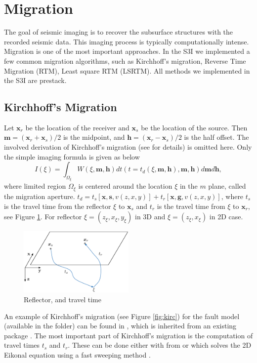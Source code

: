 \documentclass[11pt,titlepage]{article}
\newcommand{\bx}{\boldsymbol{x}}
\newcommand{\bg}{\boldsymbol{g}}
\newcommand{\bh}{\boldsymbol{h}}
\newcommand{\bs}{\boldsymbol{s}}
\newcommand{\bm}{\boldsymbol{m}}
\theoremstyle{plain}
\theoremstyle{definition}
\theoremstyle{remark}
\numberwithin{equation}{section}
\begin{document}
\section{Migration}
The goal of seismic imaging is to recover the subsurface structures with the recorded seismic data. This imaging process is typically computationally intense. Migration is one of the most important approaches. In the S3I we implemented a few common migration algorithms, such as Kirchhoff's migration, Reverse Time Migration (RTM), Least square RTM (LSRTM). All methods we implemented in the S3I are prestack.  


\subsection{Kirchhoff's Migration}
Let $\bx_r$ be the location of the receiver and $\bx_s$ be the location of the source. Then $\bm=(\bx_r+\bx_s)/2$ is the midpoint, and $\bh=(\bx_r-\bx_s)/2$ is the half offset. The involved derivation of Kirchhoff's migration (see \cite{Schneider:1978aa} for details) is omitted here. Only the simple imaging formula is given as below
\begin{equation}
\label{eq:kirchhoffImaging}
I(\xi)=\int_{\Omega_\xi} W(\xi,\bm,\bh)dt(t=t_d(\xi,
\bm,\bh),\bm,\bh)d\bm d\bh,
\end{equation}
where limited region $\Omega_\xi$ is centered around the location $\xi$ in the $m$ plane, called the migration aperture. $t_d=t_s[\bx,\bs,v(z,x,y)]+t_r[\bx,\bg,v(z,x,y)]$, where $t_s$ is the travel time from the reflector $\xi$ to $\bx_s$ and $t_r$ is the travel time from $\xi$ to $\bx_r$, see Figure \ref{fig:ref}. For reflector $\xi = (z_\xi, x_\xi, y_\xi)$ in 3D and $\xi = (z_\xi, x_\xi)$ in 2D case.

\begin{figure}[htbp]
\centering
\includegraphics[width=0.5\textwidth]{Fig/tstr}
\caption{Reflector, and travel time}
\label{fig:ref}
\end{figure}
  
An example of Kirchhoff's migration (see Figure \ref{fig:kirc}) for the fault model (available in the  folder) can be found in , which is inherited from an existing package \cite{Kozola:2011aa}. The most important part of Kirchhoff's migration is the computation of travel times $t_s$ and $t_r$. These can be done either with  from \cite{Kozola:2011aa} or  which solves the 2D Eikonal equation using a fast sweeping method \cite{Zhao:2004aa}.
\end{document}
